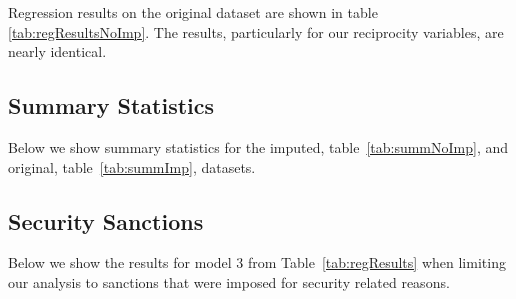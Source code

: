 Regression results on the original dataset are shown in table \ref{tab:regResultsNoImp}. The results, particularly for our reciprocity variables, are nearly identical. 

\newpage

\subsection*{Summary Statistics}
\label{appSumm}

Below we show summary statistics for the imputed, table~\ref{tab:summNoImp}, and original, table~\ref{tab:summImp}, datasets.


\FloatBarrier


\FloatBarrier

\subsection*{Security Sanctions}
\label{appSecSanc}

Below we show the results for model 3 from Table~\ref{tab:regResults} when limiting our analysis to sanctions that were imposed for security related reasons.


\FloatBarrier

\newpage